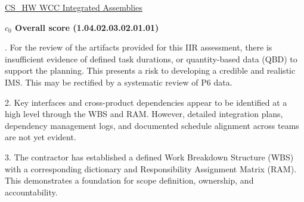 % 


\begin{frame}{\href{run:../local/source-docs/1.04.02.03.02.01.01.pdf}{CS\_HW WCC Integrated Assemblies}}
\centering
{}
\par
\vspace{0.75em}
\textbf{\small{\(c_0\) Overall score {\tiny (1.04.02.03.02.01.01)}}}\\\par
\vspace{0.5em}
\begin{minipage}{0.85\textwidth}
\raggedright
\fontsize{7}{9}. For the review of the artifacts provided for this IIR assessment, there is insufficient evidence of defined task durations, or quantity-based data (QBD) to support the planning. This presents a risk to developing a credible and realistic IMS. This may be rectified by a systematic review of P6 data.\par\vspace{0.5em}2. Key interfaces and cross-product dependencies appear to be identified at a high level through the WBS and RAM. However, detailed integration plans, dependency management logs, and documented schedule alignment across teams are not yet evident.\par\vspace{0.5em}3. The contractor has established a defined Work Breakdown Structure (WBS) with a corresponding dictionary and Responsibility Assignment Matrix (RAM). This demonstrates a foundation for scope definition, ownership, and accountability.\par
\end{minipage}
\end{frame}
